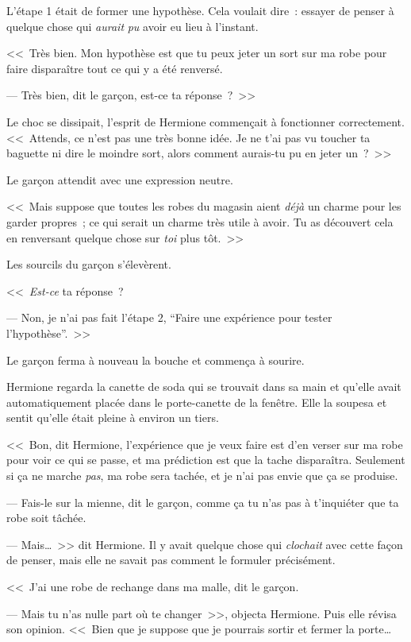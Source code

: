 L'étape 1 était de former une hypothèse. Cela voulait dire~: essayer de penser à quelque chose qui \emph{aurait} \emph{pu} avoir eu lieu à l'instant.

<<~Très bien. Mon hypothèse est que tu peux jeter un sort sur ma robe pour faire disparaître tout ce qui y a été renversé.

--- Très bien, dit le garçon, est-ce ta réponse~?~>>

Le choc se dissipait, l'esprit de Hermione commençait à fonctionner correctement. <<~Attends, ce n'est pas une très bonne idée. Je ne t'ai pas vu toucher ta baguette ni dire le moindre sort, alors comment aurais-tu pu en jeter un~?~>>

Le garçon attendit avec une expression neutre.

<<~Mais suppose que toutes les robes du magasin aient \emph{déjà} un charme pour les garder propres~; ce qui serait un charme très utile à avoir. Tu as découvert cela en renversant quelque chose sur \emph{toi} plus tôt.~>>

Les sourcils du garçon s'élevèrent.

<<~\emph{Est-ce} ta réponse~?

--- Non, je n'ai pas fait l'étape 2, “Faire une expérience pour tester l'hypothèse”.~>>

Le garçon ferma à nouveau la bouche et commença à sourire.

Hermione regarda la canette de soda qui se trouvait dans sa main et qu'elle avait automatiquement placée dans le porte-canette de la fenêtre. Elle la soupesa et sentit qu'elle était pleine à environ un tiers.

<<~Bon, dit Hermione, l'expérience que je veux faire est d'en verser sur ma robe pour voir ce qui se passe, et ma prédiction est que la tache disparaîtra. Seulement si ça ne marche \emph{pas}, ma robe sera tachée, et je n'ai pas envie que ça se produise.

--- Fais-le sur la mienne, dit le garçon, comme ça tu n'as pas à t'inquiéter que ta robe soit tâchée.

--- Mais…~>> dit Hermione. Il y avait quelque chose qui \emph{clochait} avec cette façon de penser, mais elle ne savait pas comment le formuler précisément.

<<~J'ai une robe de rechange dans ma malle, dit le garçon.

--- Mais tu n'as nulle part où te changer~>>, objecta Hermione. Puis elle révisa son opinion. <<~Bien que je suppose que je pourrais sortir et fermer la porte…

